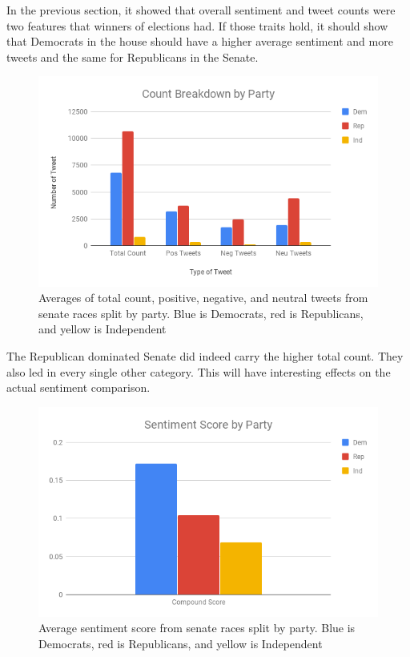 \documentclass[11pt, twoside, reqno]{book}
\begin{document}
In the previous section, it showed that overall sentiment and tweet counts were two features that winners of elections had. If those traits hold, it should show that Democrats in the house should have a higher average sentiment and more tweets and the same for Republicans in the Senate. 

\begin{figure}[H]
\centering
	\includegraphics[scale=0.5]{count_party_senate}
	\caption{Averages of total count, positive, negative, and neutral tweets from senate races split by party. Blue is Democrats, red is Republicans, and yellow is Independent}\label{fig:count_party_senate}	
\end{figure}

The Republican dominated Senate did indeed carry the higher total count. They also led in every single other category. This will have interesting effects on the actual sentiment comparison.

\begin{figure}[H]
\centering
	\includegraphics[scale=0.5]{party_sent}
	\caption{Average sentiment score from senate races split by party. Blue is Democrats, red is Republicans, and yellow is Independent}\label{fig:party_sent}
\end{figure}
\end{document}
